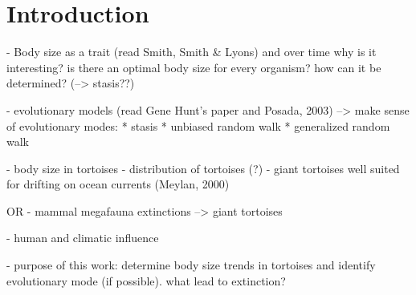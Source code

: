 \section{Introduction}

- Body size as a trait (read Smith, Smith \& Lyons) and over time
why is it interesting?
is there an optimal body size for every organism? how can it be determined? (--> stasis??)

- evolutionary models (read Gene Hunt's paper and Posada, 2003)
-->  make sense of evolutionary modes:
* stasis
* unbiased random walk
* generalized random walk


- body size in tortoises %
- distribution of tortoises (?)
- giant tortoises well suited for drifting on ocean currents (Meylan, 2000)

OR
- mammal megafauna extinctions --> giant tortoises

- human and climatic influence

- purpose of this work: determine body size trends in tortoises and identify evolutionary mode (if possible). what lead to extinction?



